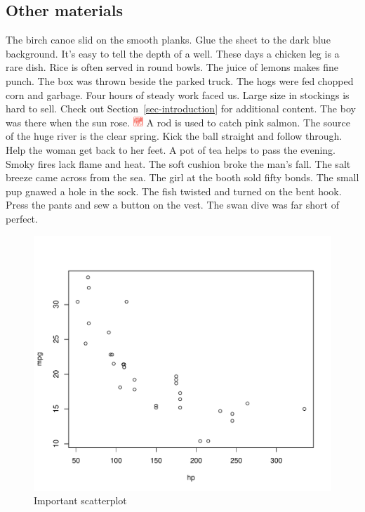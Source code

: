\documentclass[
  letterpaper,
  DIV=11,
  numbers=noendperiod]{scrartcl}
\begin{document}
\newpage{}

\hypertarget{other-materials}{%
\subsection{Other materials}\label{other-materials}}

The birch canoe slid on the smooth planks. Glue the sheet to the dark
blue background. It's easy to tell the depth of a well. These days a
chicken leg is a rare dish. Rice is often served in round bowls. The
juice of lemons makes fine punch. The box was thrown beside the parked
truck. The hogs were fed chopped corn and garbage. Four hours of steady
work faced us. Large size in stockings is hard to sell. Check out
Section~\ref{sec-introduction} for additional content. The boy was there
when the sun rose.
\includegraphics[width=\textwidth,height=1em]{stamp1a.jpg} A rod is used
to catch pink salmon. The source of the huge river is the clear spring.
Kick the ball straight and follow through. Help the woman get back to
her feet. A pot of tea helps to pass the evening. Smoky fires lack flame
and heat. The soft cushion broke the man's fall. The salt breeze came
across from the sea. The girl at the booth sold fifty bonds. The small
pup gnawed a hole in the sock. The fish twisted and turned on the bent
hook. Press the pants and sew a button on the vest. The swan dive was
far short of perfect.

\begin{figure}

\hfill{} \includegraphics{man_files/figure-pdf/unnamed-chunk-2-1.pdf}

\caption{Important scatterplot}

\end{figure}
\end{document}

